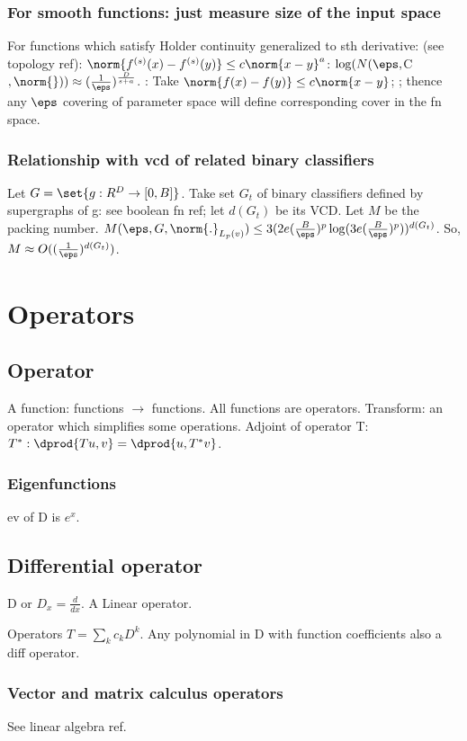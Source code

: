 \documentclass[oneside, article]{memoir}
\begin{document}
\subsection{For smooth functions: just measure size of the input space}
For functions which satisfy Holder continuity generalized to sth derivative: (see topology ref): $\norm{f^{(s)}(x) - f^{(s)}(y)} \leq c \norm{x-y}^{a}$: $\log (N(\eps, $C$, \norm{})) \approx (\frac{1}{\eps})^{\frac{D}{s+a}}$. \pf: Take $\norm{f(x) - f(y)} \leq c \norm{x-y}$; ; thence any $\eps$ covering of parameter space will define corresponding cover in the fn space.

\subsection{Relationship with vcd of related binary classifiers}
Let $G = \set{g:R^{D} \to [0, B]}$. Take set $G_t$ of binary classifiers defined by supergraphs of g: see boolean fn ref; let $d(G_t)$ be its VCD. Let $M$ be the packing number. $M(\eps,G, \norm{.}_{L_p(v)}) \leq 3(2e (\frac{B}{\eps})^{p} \log(3e(\frac{B}{\eps})^{p}))^{d(G_t)}$. So, $M \approx O((\frac{1}{\eps})^{d(G_t)})$. \why

\chapter{Operators}
\section{Operator}
A function: functions $\to$ functions. All functions are operators. Transform: an operator which simplifies some operations. Adjoint of operator T: $T^{*} : \dprod{Tu,v} = \dprod{u, T^{*}v}$.

\subsection{Eigenfunctions}
ev of D is $e^{x}$.

\section{Differential operator}
D or $D_{x} = \frac{d}{dx}$. A Linear operator.

Operators $T = \sum_{k} c_{k}D^{k}$. Any polynomial in D with function coefficients also a diff operator.

\subsection{Vector and matrix calculus operators}
See linear algebra ref.
\end{document}
